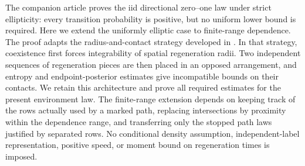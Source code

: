 The companion article \cite[Theorem~1.1]{OpenAI2026} proves the iid
directional zero--one law under strict ellipticity: every transition
probability is positive, but no uniform lower bound is required. Here we
extend the uniformly elliptic case to finite-range dependence. The proof
adapts the radius-and-contact strategy developed in
\cite[Sections~2--7]{OpenAI2026}. In that strategy, coexistence first
forces integrability of spatial regeneration radii. Two independent
sequences of regeneration pieces are then placed in an opposed arrangement,
and entropy and endpoint-posterior estimates give incompatible bounds on
their contacts. We retain this architecture and prove all required
estimates for the present environment law. The finite-range extension
depends on keeping track of the rows actually used by a marked path,
replacing intersections by proximity within the dependence range, and
transferring only the stopped path laws justified by separated rows.
No conditional density assumption, independent-label representation,
positive speed, or moment bound on regeneration times is imposed.
